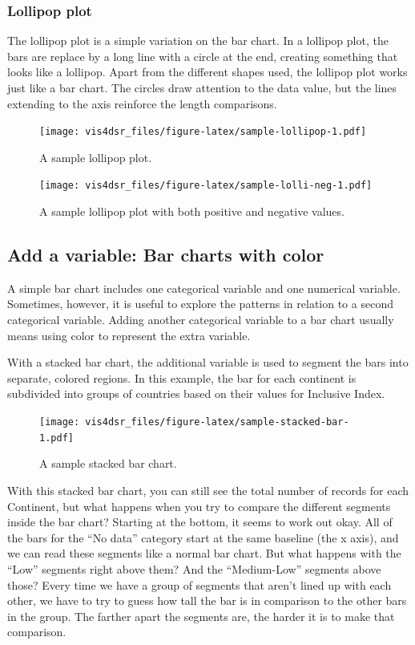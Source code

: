 \documentclass[
]{krantz}
\begin{document}
\hypertarget{lollipop-plot}{%
\subsubsection{Lollipop plot}\label{lollipop-plot}}

The lollipop plot is a simple variation on the bar chart. In a lollipop plot,
the bars are replace by a long line with a circle at the end, creating something
that looks like a lollipop. Apart from the different shapes used, the lollipop plot
works just like a bar chart. The circles draw attention to the data value, but the
lines extending to the axis reinforce the length comparisons.

\begin{figure}
\centering
\texttt{[image: vis4dsr\_files/figure-latex/sample-lollipop-1.pdf]}
\caption{\label{fig:sample-lollipop}A sample lollipop plot.}
\end{figure}

\begin{figure}
\centering
\texttt{[image: vis4dsr\_files/figure-latex/sample-lolli-neg-1.pdf]}
\caption{\label{fig:sample-lolli-neg}A sample lollipop plot with both positive and negative values.}
\end{figure}

\hypertarget{add-a-variable-bar-charts-with-color}{%
\subsection{Add a variable: Bar charts with color}\label{add-a-variable-bar-charts-with-color}}

A simple bar chart includes one categorical variable and one numerical variable.
Sometimes, however, it is useful to explore the patterns in relation to a second
categorical variable. Adding another categorical variable to a bar chart usually
means using color to represent the extra variable.

With a stacked bar chart, the additional variable is used to segment the bars into
separate, colored regions. In this example, the bar for each continent is subdivided
into groups of countries based on their values for Inclusive Index.

\begin{figure}
\centering
\texttt{[image: vis4dsr\_files/figure-latex/sample-stacked-bar-1.pdf]}
\caption{\label{fig:sample-stacked-bar}A sample stacked bar chart.}
\end{figure}

With this stacked bar chart, you can still see the total number of records for each Continent,
but what happens when you try to compare the different segments inside the
bar chart? Starting at the bottom, it seems to work out okay. All of the bars
for the ``No data'' category start at the same baseline (the x axis), and we can
read these segments like a normal bar chart. But what happens with the ``Low'' segments
right above them? And the ``Medium-Low'' segments above those? Every time we have
a group of segments that aren't lined up with each other, we have to try to guess
how tall the bar is in comparison to the other bars in the group. The farther
apart the segments are, the harder it is to make that comparison.
\end{document}
